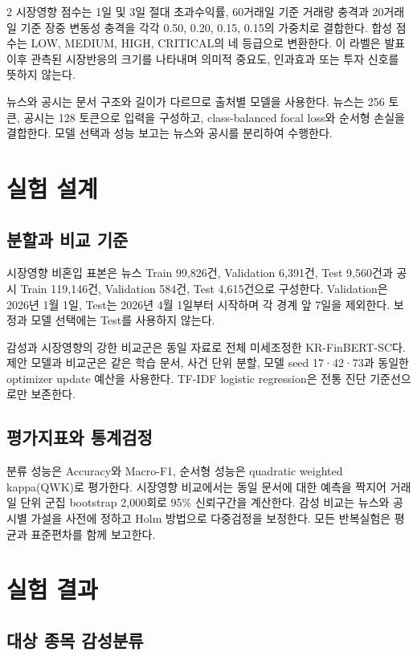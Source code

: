 \documentclass[10pt]{article}
\begin{document}
\begin{multicols}{2}
시장영향 점수는 1일 및 3일 절대 초과수익률, 60거래일 기준 거래량 충격과 20거래일 기준 장중 변동성 충격을 각각 0.50, 0.20, 0.15, 0.15의 가중치로 결합한다. 합성 점수는 LOW, MEDIUM, HIGH, CRITICAL의 네 등급으로 변환한다. 이 라벨은 발표 이후 관측된 시장반응의 크기를 나타내며 의미적 중요도, 인과효과 또는 투자 신호를 뜻하지 않는다.

뉴스와 공시는 문서 구조와 길이가 다르므로 출처별 모델을 사용한다. 뉴스는 256 토큰, 공시는 128 토큰으로 입력을 구성하고, class-balanced focal loss와 순서형 손실을 결합한다. 모델 선택과 성능 보고는 뉴스와 공시를 분리하여 수행한다.

\section{실험 설계}

\subsection{분할과 비교 기준}

시장영향 비혼입 표본은 뉴스 Train 99,826건, Validation 6,391건, Test 9,560건과 공시 Train 119,146건, Validation 584건, Test 4,615건으로 구성한다. Validation은 2026년 1월 1일, Test는 2026년 4월 1일부터 시작하며 각 경계 앞 7일을 제외한다. 보정과 모델 선택에는 Test를 사용하지 않는다.

감성과 시장영향의 강한 비교군은 동일 자료로 전체 미세조정한 KR-FinBERT-SC다. 제안 모델과 비교군은 같은 학습 문서, 사건 단위 분할, 모델 seed 17·42·73과 동일한 optimizer update 예산을 사용한다. TF-IDF logistic regression은 전통 진단 기준선으로만 보존한다.

\subsection{평가지표와 통계검정}

분류 성능은 Accuracy와 Macro-F1, 순서형 성능은 quadratic weighted kappa(QWK)로 평가한다. 시장영향 비교에서는 동일 문서에 대한 예측을 짝지어 거래일 단위 군집 bootstrap 2,000회로 95\% 신뢰구간을 계산한다. 감성 비교는 뉴스와 공시별 가설을 사전에 정하고 Holm 방법으로 다중검정을 보정한다. 모든 반복실험은 평균과 표준편차를 함께 보고한다.

\section{실험 결과}

\subsection{대상 종목 감성분류}


\end{multicols}
\end{document}
